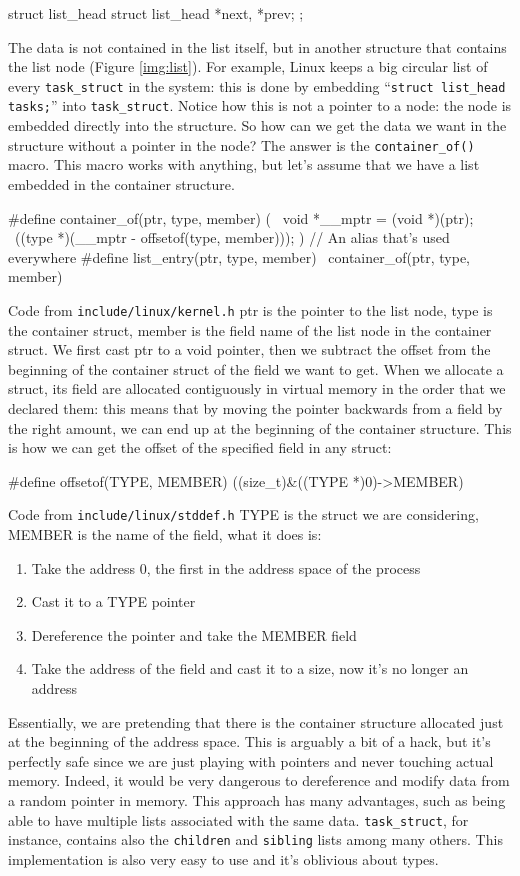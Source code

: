 \begin{code}
struct list_head {
	struct list_head *next, *prev;
};
\end{code}
The data is not contained in the list itself, but in another structure that contains the list node (Figure \ref{img:list}). For example, Linux keeps a big circular list of every \verb|task_struct| in the system: this is done by embedding ``\verb|struct list_head tasks;|'' into \verb|task_struct|. Notice how this is not a pointer to a node: the node is embedded directly into the structure. So how can we get the data we want in the structure without a pointer in the node? The answer is the \verb|container_of()| macro. This macro works with anything, but let's assume that we have a list embedded in the container structure.
\begin{code}
#define container_of(ptr, type, member) ({ \
	void *__mptr = (void *)(ptr); \
	((type *)(__mptr - offsetof(type, member))); })
// An alias that's used everywhere
#define list_entry(ptr, type, member) \
        container_of(ptr, type, member)
\end{code}
Code from \verb|include/linux/kernel.h|\newline
ptr is the pointer to the list node, type is the container struct, member is the field name of the list node in the container struct. We first cast ptr to a void pointer, then we subtract the offset from the beginning of the container struct of the field we want to get. When we allocate a struct, its field are allocated contiguously in virtual memory in the order that we declared them: this means that by moving the pointer backwards from a field by the right amount, we can end up at the beginning of the container structure. This is how we can get the offset of the specified field in any struct:
\begin{code}
#define offsetof(TYPE, MEMBER) ((size_t)&((TYPE *)0)->MEMBER)
\end{code}
Code from \verb|include/linux/stddef.h|\newline
TYPE is the struct we are considering, MEMBER is the name of the field, what it does is:
\begin{enumerate}
    \item Take the address 0, the first in the address space of the process
    \item Cast it to a TYPE pointer 
    \item Dereference the pointer and take the MEMBER field
    \item Take the address of the field and cast it to a size, now it's no longer an address
\end{enumerate}
Essentially, we are pretending that there is the container structure allocated just at the beginning of the address space. This is arguably a bit of a hack, but it's perfectly safe since we are just playing with pointers and never touching actual memory. Indeed, it would be very dangerous to dereference and modify data from a random pointer in memory. This approach has many advantages, such as being able to have multiple lists associated with the same data. \verb|task_struct|, for instance, contains also the \verb|children| and \verb|sibling| lists among many others. This implementation is also very easy to use and it's oblivious about types.

